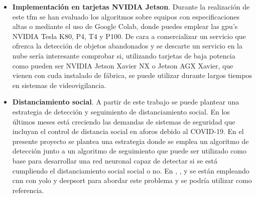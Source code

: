 \begin{itemize}
    \item \textbf{Implementación en tarjetas NVIDIA Jetson}. Durante la realización de este \gls{tfm} se han evaluado los algoritmos sobre equipos con especificaciones altas o mediante el uso de Google Colab, donde puedes emplear las \gls{gpu}'s NVIDIA Tesla K80, P4, T4 y P100. De cara a comercializar un servicio que ofrezca la detección de objetos abandonados y se descarte un servicio en la nube sería interesante comprobar si, utilizando tarjetas de baja potencia como pueden ser NVIDIA Jetson Xavier NX o Jetson AGX Xavier, que vienen con \gls{cuda} instalado de fábrica, se puede utilizar durante largos tiempos en sistemas de videovigilancia.
    \item \textbf{Distanciamiento social}. A partir de este trabajo se puede plantear una estrategia de detección y seguimiento de distanciamiento social. En los últimos meses está creciendo las demandas de sistemas de seguridad que incluyan el control de distancia social en aforos debido al COVID-19. En el presente proyecto se plantea una estrategia donde se emplea un algoritmo de detección junto a un algoritmo de seguimiento que puede ser utilizado como base para desarrollar una red neuronal capaz de detectar si se está cumpliendo el distanciamiento social social o no. En \cite{punn2020monitoring}, \cite{Rezaei_2020}, \cite{Gupta_2020} y \cite{fan2020autonomous} se están empleando \gls{cnn} con \gls{yolo} y \gls{deepsort} para abordar este problema y se podría utilizar como referencia.
    
\end{itemize}
